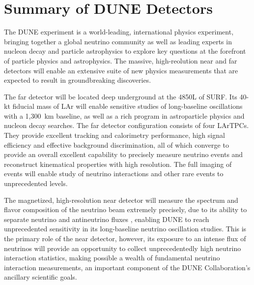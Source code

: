\chapter{Summary of DUNE Detectors}
\label{ch:detectors-summary}

The DUNE experiment is a world-leading, international physics
experiment, bringing together a global neutrino community as well as
leading experts in nucleon decay and particle astrophysics to explore
key questions at the forefront of particle physics and
astrophysics. The massive, high-reolution near and far detectors will
enable an extensive suite of new physics measurements that are
expected to result in groundbreaking discoveries.

The far detector will be located deep underground at the 4850L of
SURF.  Its 40-kt fiducial mass of LAr will enable sensitive studies of
long-baseline oscillations with a 1,300~km baseline, as well as a rich
program in astroparticle physics and nucleon decay searches.  The far
detector configuration consists of four LArTPCs.  They provide
excellent tracking and calorimetry performance, high signal efficiency
and effective background discrimination, all of which converge to
provide an overall excellent capability to precisely measure neutrino
events and reconstruct kinematical properties with high
resolution. The full imaging of events will enable study of neutrino
interactions and other rare events to unprecedented levels.


The magnetized, high-resolution near detector will measure the spectrum 
and flavor composition of the neutrino beam extremely precisely, due to its
ability to separate neutrino and antineutrino  fluxes , enabling DUNE to 
reach unprecedented sensitivity in its long-baseline neutrino
oscillation studies.  
%
This is the primary role of the near detector, however,
its exposure to an intense flux of neutrinos will provide an 
opportunity to collect unprecedentedly high neutrino
interaction statistics, making possible a wealth of fundamental neutrino
interaction measurements, an important component of the DUNE Collaboration's ancillary
scientific goals.


